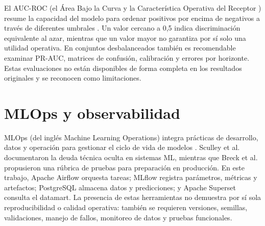 El AUC-ROC (el Área Bajo la Curva y la Característica Operativa del Receptor ) resume la capacidad del modelo para ordenar positivos por encima de negativos a través de diferentes umbrales \cite{fawcett2006introduction}. Un valor cercano a 0,5 indica discriminación equivalente al azar, mientras que un valor mayor no garantiza por sí solo una utilidad operativa. En conjuntos desbalanceados también es recomendable examinar PR-AUC, matrices de confusión, calibración y errores por horizonte. Estas evaluaciones no están disponibles de forma completa en los resultados originales y se reconocen como limitaciones.

\section{MLOps y observabilidad}

MLOps (del inglés Machine Learning Operations) integra prácticas de desarrollo, datos y operación para gestionar el ciclo de vida de modelos \cite{testi2022mlops, kreuzberger2023machine}. Sculley et al. \cite{sculley2015hidden} documentaron la deuda técnica oculta en sistemas ML, mientras que Breck et al. \cite{breck2017ml} propusieron una rúbrica de pruebas para preparación en producción. En este trabajo, Apache Airflow orquesta tareas; MLflow registra parámetros, métricas y artefactos; PostgreSQL almacena datos y predicciones; y Apache Superset consulta el datamart. La presencia de estas herramientas no demuestra por sí sola reproducibilidad o calidad operativa: también se requieren versiones, semillas, validaciones, manejo de fallos, monitoreo de datos y pruebas funcionales.